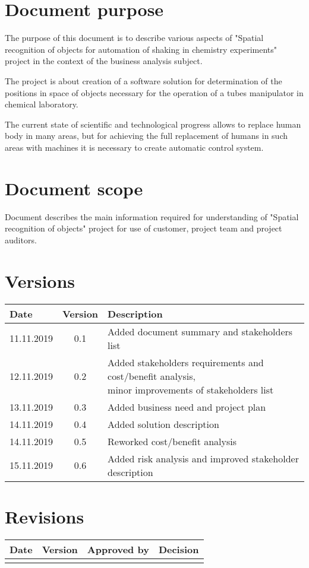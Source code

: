 \section{Document purpose} 

The purpose of this document is to describe various aspects of "Spatial recognition of objects
for automation of shaking in chemistry experiments" project in the context of the business analysis subject.


The project is about creation of a software solution for determination of the positions
in space of objects necessary for the operation of a tubes manipulator in chemical laboratory.

The current state of scientific and technological progress allows to replace human body
in many areas, but for achieving the full replacement of humans in such areas with machines
it is necessary to create automatic control system.


\section{Document scope}

Document describes the main information required for understanding of "Spatial recognition of objects"
project for use of customer, project team and project auditors.


\section{Versions}


\begin{tabular}{ | l | c | l | }
	\hline
	Date & Version & Description \\ \hline
	11.11.2019 &  0.1 & Added document summary and stakeholders list \\ \hline
	12.11.2019 &  0.2 & \specialcell{Added stakeholders requirements and cost/benefit analysis,\\ minor improvements of stakeholders list} \\ \hline
	13.11.2019 &  0.3 & Added business need and project plan \\ \hline
	14.11.2019 &  0.4 & Added solution description \\ \hline
	14.11.2019 &  0.5 & Reworked cost/benefit analysis \\ \hline
	15.11.2019 &  0.6 & Added risk analysis and improved stakeholder description \\ \hline
\end{tabular}


\section{Revisions}

\begin{tabular}{ | l | c | c | l | }
	\hline
	Date & Version & Approved by & Decision \\ \hline
	& & & \\ \hline
\end{tabular}